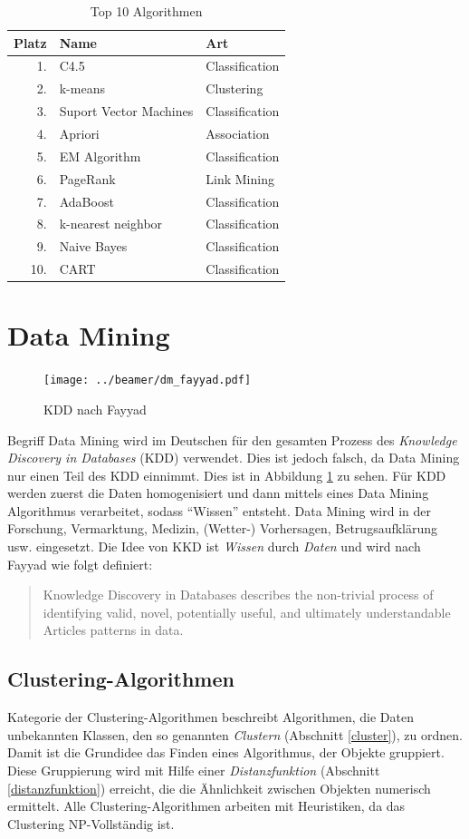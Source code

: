 \documentclass[12pt,journal,compsoc]{IEEEtran}
\begin{document}
\begin{table}
\centering
\caption{Top 10 Algorithmen \cite{wu2008top}}
\begin{tabular}{r|l|l}
Platz & Name & Art\\ \hline
1.& C4.5 & Classification\\
2.& k-means & Clustering\\
3.& Suport Vector Machines & Classification\\
4.& Apriori & Association\\
5.& EM Algorithm & Classification\\
6.& PageRank & Link Mining\\
7.& AdaBoost & Classification\\
8.& k-nearest neighbor & Classification\\
9.& Naive Bayes & Classification\\
10.& CART & Classification
\end{tabular}
\label{top10}
\end{table}

\section{Data Mining}
\begin{figure}[!b]
  \centering
  \hspace{-4em}\texttt{[image: ../beamer/dm\_fayyad.pdf]}
  \caption{KDD nach Fayyad \cite{fayyad1996data}}
  \label{kdd}
  \end{figure}
 Begriff Data Mining wird im Deutschen für den gesamten Prozess des \emph{Knowledge Discovery in Databases} (KDD) 
verwendet. Dies ist jedoch falsch, da Data Mining nur einen Teil des KDD einnimmt. Dies ist in Abbildung \ref{kdd} zu sehen. 
Für KDD werden zuerst die Daten homogenisiert und dann mittels eines Data Mining Algorithmus verarbeitet, sodass \enquote{Wissen} 
entsteht. Data Mining wird in der Forschung, Vermarktung, Medizin, (Wetter-) Vorhersagen,
Betrugsaufklärung usw. eingesetzt. Die Idee von KKD ist \emph{Wissen} durch \emph{Daten} und wird nach Fayyad \cite{fayyad1996data} wie folgt definiert: \begin{quote}
Knowledge Discovery in Databases describes the non-trivial process of identifying valid, novel, potentially useful, and ultimately understandable
Articles patterns in data.
\end{quote} 
 
 \subsection{Clustering-Algorithmen}
  Kategorie der Clustering-Algorithmen beschreibt Algorithmen, 
 die Daten unbekannten Klassen, den so genannten \emph{Clustern} (Abschnitt \ref{cluster}), zu ordnen. Damit ist die Grundidee 
 das Finden eines Algorithmus, der Objekte gruppiert. Diese Gruppierung wird mit Hilfe
 einer \emph{Distanzfunktion} (Abschnitt \ref{distanzfunktion}) erreicht, die die Ähnlichkeit zwischen Objekten numerisch ermittelt.
 Alle Clustering-Algorithmen arbeiten mit Heuristiken, da das Clustering NP-Vollständig ist.
\end{document}
